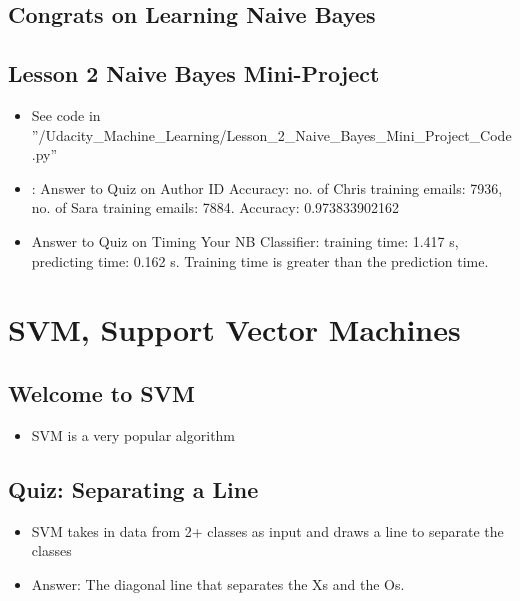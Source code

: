 \documentclass[12pt]{report}
\begin{document}
\subsection{Congrats on Learning Naive Bayes}

\subsection{Lesson 2 Naive Bayes Mini-Project}

\begin{itemize}

\item See code in ''/Udacity\_Machine\_Learning/Lesson\_2\_Naive\_Bayes\_Mini\_Project\_Code.py''

\item: Answer to Quiz on Author ID Accuracy: no. of Chris training emails: 7936, no. of Sara training emails: 7884. Accuracy: 0.973833902162

\item Answer to Quiz on Timing Your NB Classifier: training time: 1.417 s, predicting time: 0.162 s. Training time is greater than the prediction time. 

\end{itemize}


\section{SVM, Support Vector Machines}

\subsection{Welcome to SVM}

\begin{itemize}

\item SVM is a very popular algorithm

\end{itemize}

\subsection{Quiz: Separating a Line}

\begin{itemize} 

\item SVM takes in data from 2+ classes as input and draws a line to separate the classes

\item Answer: The diagonal line that separates the Xs and the Os.

\end{itemize}
\end{document}
